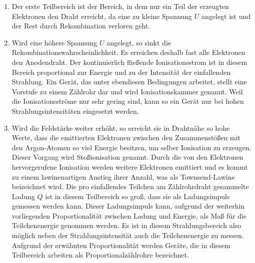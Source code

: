 \begin{enumerate} %
    \item Der erste Teilbereich ist der Bereich, in dem nur ein Teil der erzeugten Elektronen den Draht erreicht, da eine zu kleine Spannung $U$ angelegt ist 
    und der Rest durch Rekombination verloren geht.
    \item Wird eine höhere Spannung $U$ angelegt, so sinkt die Rekombinationswahrscheinlichkeit. Es erreichen deshalb fast alle Elektronen den Anodendraht. 
    Der kontinuierlich fließende Ionisationsstrom ist in diesem Bereich proportional zur Energie und zu der Intensität der einfallenden Strahlung. Ein Gerät,
    das unter ebendiesen Bedingungen arbeitet, stellt eine Vorstufe zu einem Zählrohr dar und wird Ionisationskammer genannt. Weil die Ionisationsströme nur sehr gering sind, kann so ein Gerät nur bei
    hohen Strahlungsintensitäten eingesetzt werden.
    \item Wird die Feldstärke weiter erhöht, so erreicht sie in Drahtnähe so hohe Werte, dass die emittierten Elektronen zwischen den Zusammenstößen mit den Argon-Atomen so viel Energie besitzen, um selber Ionisation zu erzeugen.
    Dieser Vorgang wird Stoßionisation genannt. Durch die von den Elektronen hervorgerufene Ionisation werden weitere Elektronen emittiert und es kommt zu einem lawinenartigen Anstieg ihrer Anzahl, was als Townsend-Lawine beizeichnet wird. 
    Die pro einfallendes Teilchen am Zählrohrdraht gesammelte Ladung $Q$ ist in diesem Teilbereich so groß, dass sie als Ladungsimpuls gemessen werden kann. Dieser Ladungsimpuls kann, aufgrund der weiterhin vorliegenden Proportionalität zwischen Ladung und Energie,
    als Maß für die Teilchenenergie genommen werden. Es ist in diesem Strahlungsbereich also möglich neben der Strahlungsintensität auch die Teilchenenergie zu messen. Aufgrund der erwähnten Proportionalität werden Geräte, die in diesem Teilbereich arbeiten als Proportionalzählrohre bezeichnet.
\end{enumerate}
